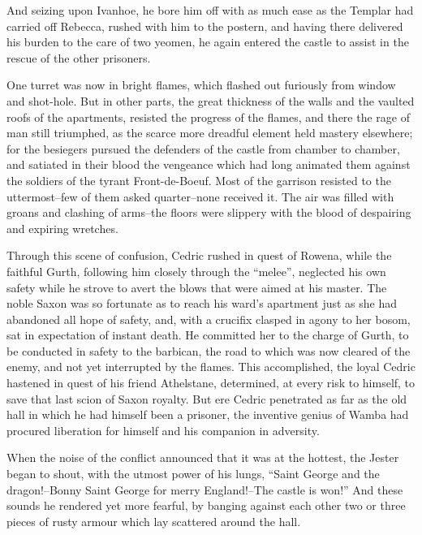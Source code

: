 And seizing upon Ivanhoe, he bore him off with as much ease as the
Templar had carried off Rebecca, rushed with him to the postern, and
having there delivered his burden to the care of two yeomen, he again
entered the castle to assist in the rescue of the other prisoners.

One turret was now in bright flames, which flashed out furiously from
window and shot-hole. But in other parts, the great thickness of the
walls and the vaulted roofs of the apartments, resisted the progress of
the flames, and there the rage of man still triumphed, as the scarce
more dreadful element held mastery elsewhere; for the besiegers pursued
the defenders of the castle from chamber to chamber, and satiated in
their blood the vengeance which had long animated them against the
soldiers of the tyrant Front-de-Boeuf. Most of the garrison resisted to
the uttermost--few of them asked quarter--none received it. The air was
filled with groans and clashing of arms--the floors were slippery with
the blood of despairing and expiring wretches.

Through this scene of confusion, Cedric rushed in quest of Rowena, while
the faithful Gurth, following him closely through the ``melee'',
neglected his own safety while he strove to avert the blows that were
aimed at his master. The noble Saxon was so fortunate as to reach his
ward's apartment just as she had abandoned all hope of safety, and, with
a crucifix clasped in agony to her bosom, sat in expectation of instant
death. He committed her to the charge of Gurth, to be conducted in
safety to the barbican, the road to which was now cleared of the enemy,
and not yet interrupted by the flames. This accomplished, the loyal
Cedric hastened in quest of his friend Athelstane, determined, at every
risk to himself, to save that last scion of Saxon royalty. But ere
Cedric penetrated as far as the old hall in which he had himself been a
prisoner, the inventive genius of Wamba had procured liberation for
himself and his companion in adversity.

When the noise of the conflict announced that it was at the hottest, the
Jester began to shout, with the utmost power of his lungs, ``Saint
George and the dragon!--Bonny Saint George for merry England!--The
castle is won!'' And these sounds he rendered yet more fearful, by
banging against each other two or three pieces of rusty armour which lay
scattered around the hall.

